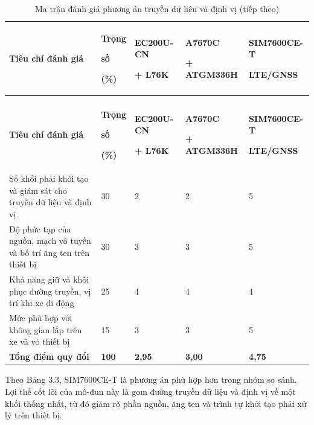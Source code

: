 \documentclass[a4paper]{extarticle}
\newcommand{\thesissettableid}[2]{%
  \renewcommand{\thetable}{#1}%
  \renewcommand{\theHtable}{#2}%
}
\begin{document}
{\thesissettableid{3.3}{condensed-r2-bang-3-3-ma-tran-danh-gia-phuong-an-truyen-du-lieu-va-dinh-vi}
\def\LTcaptype{table}
\begin{longtable}{|L{(\linewidth - 8\tabcolsep) * }|L{(\linewidth - 8\tabcolsep) * }|L{(\linewidth - 8\tabcolsep) * }|L{(\linewidth - 8\tabcolsep) * }|L{(\linewidth - 8\tabcolsep) * }|}
\caption{Ma trận đánh giá phương án truyền dữ liệu và định vị}\label{tab:condensed-r2-bang-3-3-ma-tran-danh-gia-phuong-an-truyen-du-lieu-va-dinh-vi}\\
\hline
\textbf{Tiêu chí đánh giá} & {\footnotesize\textbf{Trọng}\par\textbf{số}\par\textbf{(\%)}} & {\scriptsize\textbf{EC200U-CN}\par\textbf{+ L76K}} & {\scriptsize\textbf{A7670C}\par\textbf{+ ATGM336H}} & {\scriptsize\textbf{SIM7600CE-T}\par\textbf{LTE/GNSS}} \\
\hline
\endfirsthead
\caption[]{Ma trận đánh giá phương án truyền dữ liệu và định vị (tiếp theo)}\\
\hline
\textbf{Tiêu chí đánh giá} & {\footnotesize\textbf{Trọng}\par\textbf{số}\par\textbf{(\%)}} & {\scriptsize\textbf{EC200U-CN}\par\textbf{+ L76K}} & {\scriptsize\textbf{A7670C}\par\textbf{+ ATGM336H}} & {\scriptsize\textbf{SIM7600CE-T}\par\textbf{LTE/GNSS}} \\
\hline
\endhead
\endfoot
\endlastfoot
Số khối phải khởi tạo và giám sát cho truyền dữ liệu và định vị & 30 & 2 & 2 & 5 \\\hline
Độ phức tạp của nguồn, mạch vô tuyến và bố trí ăng ten trên thiết bị & 30 & 3 & 3 & 5 \\\hline
Khả năng giữ và khôi phục đường truyền, vị trí khi xe di động & 25 & 4 & 4 & 4 \\\hline
Mức phù hợp với không gian lắp trên xe và vỏ thiết bị & 15 & 3 & 3 & 5 \\\hline
\textbf{Tổng điểm quy đổi} & \textbf{100} & \textbf{2,95} & \textbf{3,00} & \textbf{4,75} \\\hline
\end{longtable}
}
Theo Bảng 3.3, SIM7600CE-T là phương án phù hợp hơn trong nhóm so sánh. Lợi thế cốt lõi của mô-đun này là gom đường truyền dữ liệu và định vị về một khối thống nhất, từ đó giảm rõ phần nguồn, ăng ten và trình tự khởi tạo phải xử lý trên thiết bị.
\end{document}
